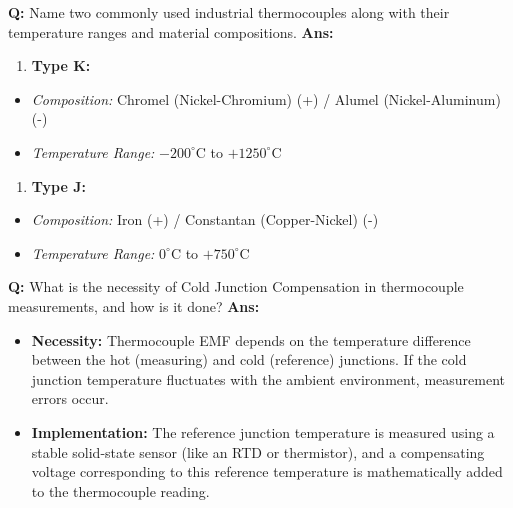 \documentclass[10pt,a4paper,twocolumn]{article}
\begin{document}
\begin{tcolorbox}[
  colback=white,
  colframe=UnitColorOne,
  colbacktitle=gray!10!white,
  coltitle=black,
  fonttitle=\bfseries\sffamily\small,
  title={Unit I $\bullet$ Card 5: Thermocouple Types and Composition},
  boxrule=1.2pt,
  arc=2mm,
  outer arc=2mm,
  boxsep=1.5mm,
  top=1mm,
  bottom=1mm,
  left=1.5mm,
  right=1.5mm,
  before skip=2.5mm,
  after skip=2.5mm
]
\textbf{Q:} Name two commonly used industrial thermocouples along with their temperature ranges and material compositions.
\tcbline
\textbf{Ans:} \begin{enumerate}
  \item \textbf{Type K:}
\end{enumerate}
\begin{itemize}
  \item   \textit{Composition:} Chromel (Nickel-Chromium) (+) / Alumel (Nickel-Aluminum) (-)
  \item   \textit{Temperature Range:} $-200^\circ\text{C}$ to $+1250^\circ\text{C}$
\end{itemize}
\begin{enumerate}
  \item \textbf{Type J:}
\end{enumerate}
\begin{itemize}
  \item   \textit{Composition:} Iron (+) / Constantan (Copper-Nickel) (-)
  \item   \textit{Temperature Range:} $0^\circ\text{C}$ to $+750^\circ\text{C}$
\end{itemize}
\end{tcolorbox}


\begin{tcolorbox}[
  colback=white,
  colframe=UnitColorOne,
  colbacktitle=gray!10!white,
  coltitle=black,
  fonttitle=\bfseries\sffamily\small,
  title={Unit I $\bullet$ Card 6: Cold Junction Compensation (CJC)},
  boxrule=1.2pt,
  arc=2mm,
  outer arc=2mm,
  boxsep=1.5mm,
  top=1mm,
  bottom=1mm,
  left=1.5mm,
  right=1.5mm,
  before skip=2.5mm,
  after skip=2.5mm
]
\textbf{Q:} What is the necessity of Cold Junction Compensation in thermocouple measurements, and how is it done?
\tcbline
\textbf{Ans:} \begin{itemize}
  \item   \textbf{Necessity:} Thermocouple EMF depends on the temperature difference between the hot (measuring) and cold (reference) junctions. If the cold junction temperature fluctuates with the ambient environment, measurement errors occur.
  \item   \textbf{Implementation:} The reference junction temperature is measured using a stable solid-state sensor (like an RTD or thermistor), and a compensating voltage corresponding to this reference temperature is mathematically added to the thermocouple reading.
\end{itemize}
\end{tcolorbox}
\end{document}
